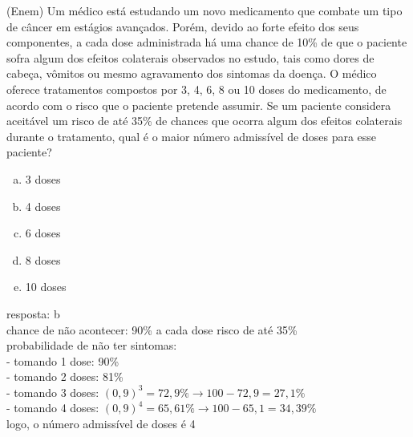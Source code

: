 \begin{ex}
(Enem) Um médico está estudando um novo medicamento que combate um tipo de  câncer em estágios avançados. Porém, devido ao forte efeito dos seus componentes, a cada dose administrada há uma chance de 10\% de que o paciente sofra algum dos efeitos colaterais observados no estudo, tais como dores de cabeça, vômitos ou mesmo agravamento dos sintomas da doença. O médico oferece tratamentos compostos por 3, 4, 6, 8 ou 10 doses do medicamento, de acordo com o risco que o paciente pretende assumir.  Se um paciente considera aceitável um risco de até 35\% de chances que ocorra algum dos efeitos colaterais durante o tratamento, qual é o maior número admissível de doses para esse paciente?
   \begin{enumerate}[(a)]
   \item 3 doses
   \item 4 doses 
   \item 6 doses
   \item 8 doses
   \item 10 doses
   \end{enumerate}
     \begin{sol}
      resposta: b \\
      chance de não acontecer: 90\% a cada dose\hspace{0,6cm} risco de até 35\% \\
      probabilidade de não ter sintomas:\\
      - tomando 1 dose: 90\% \\
      - tomando 2 doses: 81\% \\
      - tomando 3 doses: $(0,9)^3=72,9\% \rightarrow 100-72,9=27,1\%$ \\
      - tomando 4 doses: $(0,9)^4=65,61\% \rightarrow 100 - 65,1=34,39\%$ \\
        logo, o número admissível de doses é 4
     \end{sol}
\end{ex}